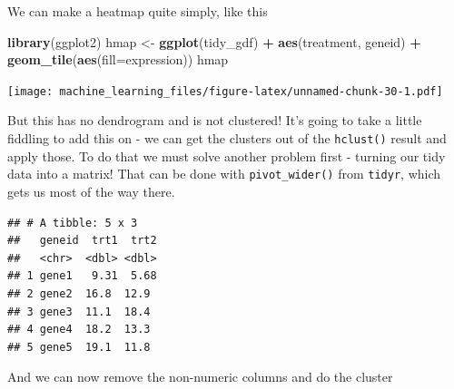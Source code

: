 \documentclass[
]{book}
\newenvironment{Shaded}{\begin{snugshade}}{\end{snugshade}}
\newcommand{\DataTypeTok}[1]{\textcolor[rgb]{0.13,0.29,0.53}{#1}}
\newcommand{\KeywordTok}[1]{\textcolor[rgb]{0.13,0.29,0.53}{\textbf{#1}}}
\newcommand{\NormalTok}[1]{#1}
\newcommand{\OperatorTok}[1]{\textcolor[rgb]{0.81,0.36,0.00}{\textbf{#1}}}
\newcommand{\OtherTok}[1]{\textcolor[rgb]{0.56,0.35,0.01}{#1}}
\newcommand{\StringTok}[1]{\textcolor[rgb]{0.31,0.60,0.02}{#1}}
\begin{document}
We can make a heatmap quite simply, like this

\begin{Shaded}
\begin{Highlighting}[]
\KeywordTok{library}\NormalTok{(ggplot2)}
\NormalTok{hmap <-}\StringTok{ }\KeywordTok{ggplot}\NormalTok{(tidy_gdf) }\OperatorTok{+}\StringTok{ }\KeywordTok{aes}\NormalTok{(treatment, geneid) }\OperatorTok{+}\StringTok{ }\KeywordTok{geom_tile}\NormalTok{(}\KeywordTok{aes}\NormalTok{(}\DataTypeTok{fill=}\NormalTok{expression))}
\NormalTok{hmap}
\end{Highlighting}
\end{Shaded}

\texttt{[image: machine\_learning\_files/figure-latex/unnamed-chunk-30-1.pdf]}

But this has no dendrogram and is not clustered! It's going to take a little fiddling to add this on - we can get the clusters out of the \texttt{hclust()} result and apply those. To do that we must solve another problem first - turning our tidy data into a matrix! That can be done with \texttt{pivot\_wider()} from \texttt{tidyr}, which gets us most of the way there.

\begin{Shaded}
\end{Shaded}

\begin{verbatim}
## # A tibble: 5 x 3
##   geneid  trt1  trt2
##   <chr>  <dbl> <dbl>
## 1 gene1   9.31  5.68
## 2 gene2  16.8  12.9 
## 3 gene3  11.1  18.4 
## 4 gene4  18.2  13.3 
## 5 gene5  19.1  11.8
\end{verbatim}

And we can now remove the non-numeric columns and do the cluster

\begin{Shaded}
\end{Shaded}
\end{document}
